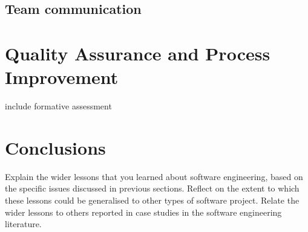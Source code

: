 \documentclass{l3proj}
\begin{document}
\subsection*{Team communication}



\section{Quality Assurance and Process Improvement}
\label{sec:managing}

include formative assessment

\section{Conclusions}

Explain the wider lessons that you learned about software engineering,
based on the specific issues discussed in previous sections.  Reflect
on the extent to which these lessons could be generalised to other
types of software project.  Relate the wider lessons to others
reported in case studies in the software engineering literature.




\end{document}
